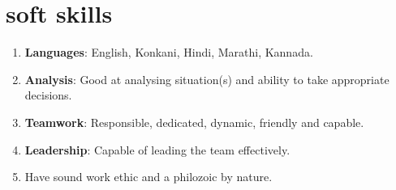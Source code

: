 \documentclass[10pt]{article}
\begin{document}
\section*{soft skills}
\begin{enumerate}
\item \textbf{Languages}: English, Konkani, Hindi, Marathi, Kannada.
\item \textbf{Analysis}: Good at analysing situation(s) and ability to take appropriate decisions.
\item\textbf{Teamwork}: Responsible, dedicated, dynamic, friendly and capable.
\item\textbf{Leadership}: Capable of leading the team effectively. 
\item Have sound work ethic and a philozoic by nature.
\end{enumerate}
\end{document}
